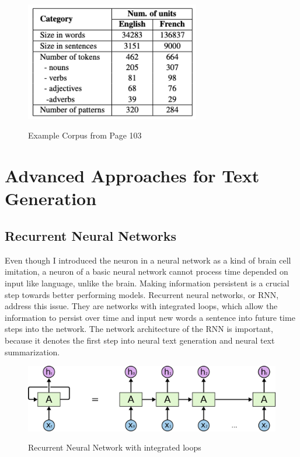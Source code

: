 \begin{figure}
	\begin{center}
		\includegraphics[width=3in]{photos/corpus}\\
		\caption{Example Corpus from \cite{elena} Page 103}\label{corpus}
	\end{center}
\end{figure}

\section{Advanced Approaches for Text Generation}\label{ss:aatg}
\subsection{Recurrent Neural Networks}\label{ss:rnn}
Even though I introduced the neuron in a neural network as a kind of brain cell imitation, a neuron of a basic neural network cannot process time depended on input like language, unlike the brain. Making information persistent is a crucial step towards better performing models. Recurrent neural networks, or RNN, address this issue. They are networks with integrated loops, which allow the information to persist over time and input new words a sentence into future time steps into the network\cite{olah}. The network architecture of the RNN is important, because it denotes the first step into neural text generation and neural text summarization. 

\begin{figure}
	\begin{center}
		\includegraphics[width=4.5in]{photos/RNN-unrolled}\\
		\caption{Recurrent Neural Network with integrated loops \cite{olah}}\label{rnn}
	\end{center}
\end{figure}

